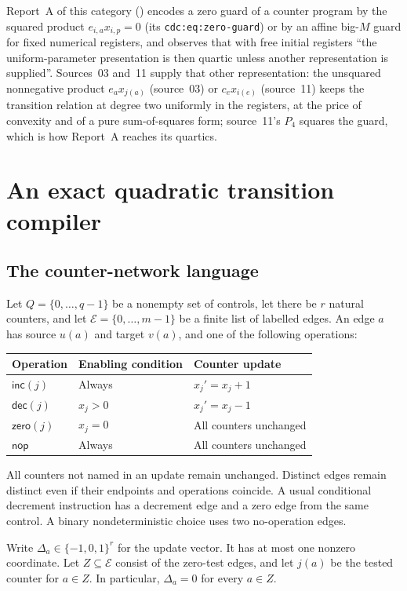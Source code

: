 \documentclass[11pt,letterpaper]{article}
\theoremstyle{definition}
\theoremstyle{remark}
\newcommand{\1}{\mathbf 1}
\newcommand{\srctag}[1]{\texorpdfstring{\hspace{0.4em}{\normalfont\small\color{accent}[source #1]}}{ [source #1]}}
\begin{document}
Report~A of this category () encodes a zero guard of a
counter program by the squared product $e_{i,a}x_{i,p}=0$ (its \texttt{cdc:eq:zero-guard}) or by
an affine big-$M$ guard for fixed numerical registers, and observes that with free initial
registers ``the uniform-parameter presentation is then quartic unless another representation is
supplied''. Sources~03 and~11 supply that other representation: the unsquared nonnegative product
$e_ax_{j(a)}$ (source~03) or $c_ex_{i(e)}$ (source~11) keeps the transition relation at degree
two uniformly in the registers, at the price of convexity and of a pure sum-of-squares form;
source~11's $P_4$ squares the guard, which is how Report~A reaches its quartics.
\section{An exact quadratic transition compiler\srctag{03}}\label{lbh:qd:sec:compiler}

\subsection{The counter-network language}

Let $Q=\{0,\ldots,q-1\}$ be a nonempty set of controls, let there be $r$
natural counters, and let $\mathcal E=\{0,\ldots,m-1\}$ be a finite list of
labelled edges. An edge $a$ has source $u(a)$ and target $v(a)$, and one of the
following operations:
\begin{center}
\begin{tabular}{@{}lll@{}}
\toprule
Operation & Enabling condition & Counter update\\
\midrule
$\mathsf{inc}(j)$ & Always & $x_j'=x_j+1$\\
$\mathsf{dec}(j)$ & $x_j>0$ & $x_j'=x_j-1$\\
$\mathsf{zero}(j)$ & $x_j=0$ & All counters unchanged\\
$\mathsf{nop}$ & Always & All counters unchanged\\
\bottomrule
\end{tabular}
\end{center}
All counters not named in an update remain unchanged. Distinct edges remain
distinct even if their endpoints and operations coincide. A usual conditional
decrement instruction has a decrement edge and a zero edge from the same
control. A binary nondeterministic choice uses two no-operation edges.

Write $\Delta_a\in\{-1,0,1\}^r$ for the update vector. It has at most one
nonzero coordinate. Let $Z\subseteq\mathcal E$ consist of the zero-test edges,
and let $j(a)$ be the tested counter for $a\in Z$. In particular,
$\Delta_a=0$ for every $a\in Z$.
\end{document}
